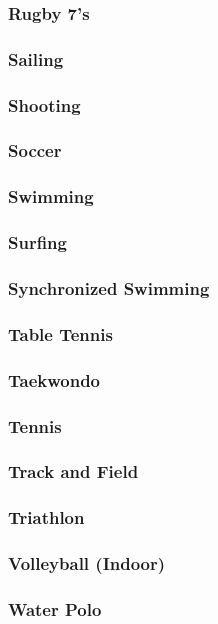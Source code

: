 			\subsubsection{Rugby 7's}
			\subsubsection{Sailing}
			\subsubsection{Shooting}
			\subsubsection{Soccer}
			\subsubsection{Swimming}
			\subsubsection{Surfing}
			\subsubsection{Synchronized Swimming}
			\subsubsection{Table Tennis}
			\subsubsection{Taekwondo}
			\subsubsection{Tennis}
			\subsubsection{Track and Field}
			\subsubsection{Triathlon}
			\subsubsection{Volleyball (Indoor)}
			\subsubsection{Water Polo}
